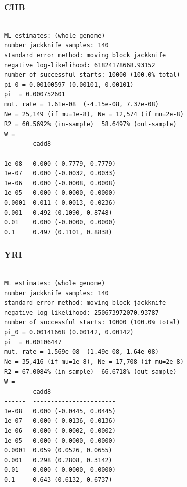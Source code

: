 \documentclass[11pt]{article}
\begin{document}
\subsubsection*{CHB}
\begin{minipage}{\linewidth}\begin{footnotesize}
\begin{verbatim}

ML estimates: (whole genome)
number jackknife samples: 140
standard error method: moving block jackknife
negative log-likelihood: 61824178668.93152
number of successful starts: 10000 (100.0% total)
pi_0 = 0.00100597 (0.00101, 0.00101)
pi  = 0.000752601
mut. rate = 1.61e-08  (-4.15e-08, 7.37e-08)
Ne = 25,149 (if mu=1e-8), Ne = 12,574 (if mu=2e-8)
R2 = 60.5692% (in-sample)  58.6497% (out-sample)
W = 
        cadd8
------  -----------------------
1e-08   0.000 (-0.7779, 0.7779)
1e-07   0.000 (-0.0032, 0.0033)
1e-06   0.000 (-0.0008, 0.0008)
1e-05   0.000 (-0.0000, 0.0000)
0.0001  0.011 (-0.0013, 0.0236)
0.001   0.492 (0.1090, 0.8748)
0.01    0.000 (-0.0000, 0.0000)
0.1     0.497 (0.1101, 0.8838)
\end{verbatim}
\end{footnotesize}\end{minipage}


\subsubsection*{YRI}
\begin{minipage}{\linewidth}\begin{footnotesize}
\begin{verbatim}

ML estimates: (whole genome)
number jackknife samples: 140
standard error method: moving block jackknife
negative log-likelihood: 250673972070.93787
number of successful starts: 10000 (100.0% total)
pi_0 = 0.00141668 (0.00142, 0.00142)
pi  = 0.00106447
mut. rate = 1.569e-08  (1.49e-08, 1.64e-08)
Ne = 35,416 (if mu=1e-8), Ne = 17,708 (if mu=2e-8)
R2 = 67.0084% (in-sample)  66.6718% (out-sample)
W = 
        cadd8
------  -----------------------
1e-08   0.000 (-0.0445, 0.0445)
1e-07   0.000 (-0.0136, 0.0136)
1e-06   0.000 (-0.0002, 0.0002)
1e-05   0.000 (-0.0000, 0.0000)
0.0001  0.059 (0.0526, 0.0655)
0.001   0.298 (0.2808, 0.3142)
0.01    0.000 (-0.0000, 0.0000)
0.1     0.643 (0.6132, 0.6737)
\end{verbatim}
\end{footnotesize}\end{minipage}
\end{document}
